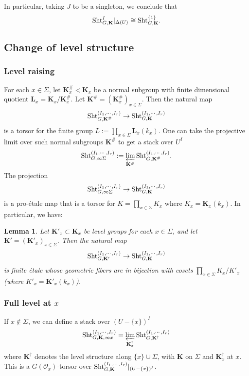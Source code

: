 \documentclass[11pt]{amsart}
\numberwithin{equation}{section}
\theoremstyle{plain}
\newtheorem{lemma}[subsubsection]{Lemma}
\theoremstyle{definition}
\newcommand\cO{\mathcal{O}}
\def\bK{\mathbf{K}}
\def\bL{\mathbf{L}}
\newcommand\Sht{\textup{Sht}}
\newcommand\sss{\subsubsection}
\newcommand\D\Delta
\newcommand{\Sig}{\Sigma}
\newcommand\da{\dagger}
\begin{document}
In particular, taking $J$ to be a singleton, we conclude that
\begin{equation*}
\Sht^{I}_{G,\bK}|_{\D(U)}\cong \Sht^{\{1\}}_{G,\bK}.
\end{equation*}




\subsection{Change of level structure}\label{ss:change level}

\sss{Level raising} For each $x\in \Sig$, let $\bK^{\#}_{x}\lhd \bK_{x}$ be a normal subgroup with finite dimensional quotient $\bL_{x}=\bK_{x}/\bK^{\#}_{x}$. Let $\bK^{\#}=(\bK^{\#}_{x})_{x\in \Sig}$. Then the natural map
\begin{equation*}
\Sht^{(I_{1},\cdots, I_{r})}_{G,\bK^{\#}} \to \Sht^{(I_{1},\cdots, I_{r})}_{G,\bK} 
\end{equation*}
is a torsor for the finite group $L:=\prod_{x\in \Sig}\bL_{x}(k_{x})$. One can take the projective limit over such normal subgroups  $\bK^{\#}$ to get a stack over $U^{I}$
\begin{equation*}
\Sht^{(I_{1},\cdots, I_{r})}_{G,\infty\Sig} :=\varprojlim_{\bK^{\#}}\Sht^{(I_{1},\cdots, I_{r})}_{G,\bK^{\#}}.
\end{equation*}
The projection
\begin{equation*}
\Sht^{(I_{1},\cdots, I_{r})}_{G,\infty\Sig}\to \Sht^{(I_{1},\cdots, I_{r})}_{G,\bK}
\end{equation*}
is a pro-\'etale map that is a torsor for $K=\prod_{x\in\Sig}K_{x}$ where $K_{x}=\bK_{x}(k_{x})$. In particular, we have:

\begin{lemma}\label{l:change level Sig}
Let $\bK'_{x}\subset \bK_{x}$ be level groups for each $x\in \Sig$, and let  $\bK'=(\bK'_{x})_{x\in \Sig}$. Then the natural map
\begin{equation*}
\Sht^{(I_{1},\cdots, I_{r})}_{G,\bK'} \to \Sht^{(I_{1},\cdots, I_{r})}_{G,\bK} 
\end{equation*}
is finite \'etale whose geometric fibers are in bijection with cosets $\prod_{x\in \Sig}K_{x}/K'_{x}$ (where $K'_{x}=\bK'_{x}(k_{x})$). 
\end{lemma}

\sss{Full level at $x$}\label{sss:full x}
If $x\notin \Sig$, we can define a stack over $(U-\{x\})^{I}$
\begin{equation*}
\Sht^{(I_{1},\cdots, I_{r})}_{G,\bK,\infty x}=\varprojlim_{\bK^{\da}_{x}}\Sht^{(I_{1},\cdots, I_{r})}_{G,\bK^{\da}}
\end{equation*}
where $\bK^{\da}$ denotes the level structure along $\{x\}\cup \Sig$, with $\bK$ on $\Sig$ and $\bK^{\da}_{x}$ at $x$. This is a $G(\cO_{x})$-torsor over $\Sht^{(I_{1},\cdots, I_{r})}_{G, \bK}|_{(U-\{x\})^{I}}$.
\end{document}
